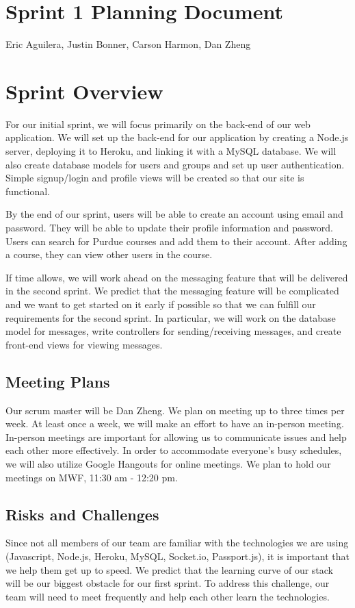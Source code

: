 \documentclass[12pt]{article}
\newcommand{\br}{\vspace{2mm}}
\newcommand{\hwTitle}{Sprint 1 Planning Document}
\newcommand{\authorName}{Eric Aguilera, Justin Bonner, Carson Harmon, Dan Zheng}
\begin{document}
\section*{\Large \centering \hwTitle}
{\centering \authorName \par}

\section{Sprint Overview}
For our initial sprint, we will focus primarily on the back-end of our web application. We will set up the back-end for our application by creating a Node.js server, deploying it to Heroku, and linking it with a MySQL database. We will also create database models for users and groups and set up user authentication. Simple signup/login and profile views will be created so that our site is functional.

\br

By the end of our sprint, users will be able to create an account using email and password. They will be able to update their profile information and password. Users can search for Purdue courses and add them to their account. After adding a course, they can view other users in the course.

\br

If time allows, we will work ahead on the messaging feature that will be delivered in the second sprint. We predict that the messaging feature will be complicated and we want to get started on it early if possible so that we can fulfill our requirements for the second sprint. In particular, we will work on the database model for messages, write controllers for sending/receiving messages, and create front-end views for viewing messages.

\subsection*{Meeting Plans}
Our scrum master will be Dan Zheng. We plan on meeting up to three times per week. At least once a week, we will make an effort to have an in-person meeting. In-person meetings are important for allowing us to communicate issues and help each other more effectively. In order to accommodate everyone's busy schedules, we will also utilize Google Hangouts for online meetings. We plan to hold our meetings on MWF, 11:30 am - 12:20 pm.

\subsection*{Risks and Challenges}
Since not all members of our team are familiar with the technologies we are using (Javascript, Node.js, Heroku, MySQL, Socket.io, Passport.js), it is important that we help them get up to speed. We predict that the learning curve of our stack will be our biggest obstacle for our first sprint. To address this challenge, our team will need to meet frequently and help each other learn the technologies.
\end{document}
